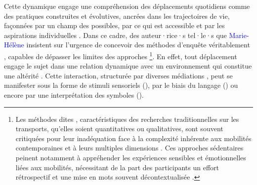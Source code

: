 \begin{refsegment}
Cette dynamique engage une compréhension des déplacements quotidiens comme des pratiques construites et évolutives, ancrées dans les trajectoires de vie, façonnées par un champ des possibles, par ce qui est accessible et par les aspirations individuelles \textcolor{blue}{\autocite[40]{kaufmann_retour_2014}}. Dans ce cadre, des auteur·rice·s tel·le·s que \textcolor{blue}{Marie-Hélène} \textcolor{blue}{\textcite{massot_mobilites_2010}} insistent sur l’urgence de concevoir des méthodes d’enquête véritablement , capables de dépasser les limites des approches \footnote{
    Les méthodes dites , caractéristiques des recherches traditionnelles sur les transports, qu’elles soient quantitatives ou qualitatives, sont souvent critiquées pour leur inadéquation face à la complexité inhérente aux mobilités contemporaines et à leurs multiples dimensions \textcolor{blue}{\autocites[110-111]{buscher_mobile_2009}[178]{merriman_rethinking_2014}}. Ces approches sédentaires peinent notamment à appréhender les expériences sensibles et émotionnelles liées aux mobilités, nécessitant de la part des participants un effort rétrospectif et une mise en mots souvent décontextualisée \textcolor{blue}{\autocite[107]{buscher_mobile_2009}}.
}. En effet, tout déplacement engage le sujet dans une relation dynamique avec un environnement qui constitue une altérité \textcolor{blue}{\autocite[4]{despres_replacer_2019}}. Cette interaction, structurée par diverses médiations \textcolor{blue}{\autocite[]{freitag_dialectique_nodate}}, peut se manifester sous la forme de stimuli sensoriels (), par le biais du langage () ou encore par une interprétation des symboles ().%


\end{refsegment}

